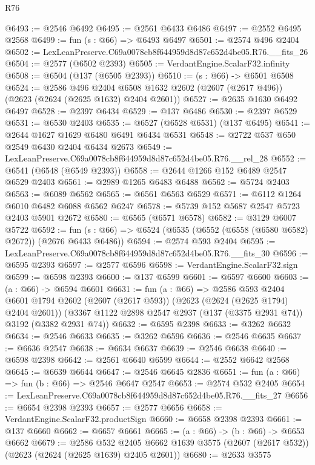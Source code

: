 \begin{lexlean}{R76}
\begin{coremodule}
@6493 := @2546 @6492
@6495 := @2561 @6433 @6486
@6497 := @2552 @6495 @2568
@6499 := fun (s : @66) => @6493 @6497
@6501 := @2574 @496 @2404
@6502 := LexLeanPreserve.C69a0078cb8f644959d8d87c652d4be05.R76.__fits_26
@6504 := @2577 (@6502 @2393)
@6505 := VerdantEngine.ScalarF32.infinity
@6508 := @6504 (@137 (@6505 @2393))
@6510 := (s : @66) -> @6501 @6508
@6524 := @2586
    @496
    @2404
    @6508
    @1632
    @2602
    (@2607 (@2617 @496))
    (@2623 (@2624 (@2625 @1632) @2404 @2601))
@6527 := @2635 @1630 @6492 @6497
@6528 := @2397 @6434
@6529 := @137 @6486
@6530 := @2397 @6529
@6531 := @6530 @2403
@6535 := @6527 (@6528 @6531) (@137 @6495)
@6541 := @2644 @1627 @1629 @6480 @6491 @6434 @6531
@6548 := @2722 @537 @650 @2549 @6430 @2404 @6434 @2673
@6549 := LexLeanPreserve.C69a0078cb8f644959d8d87c652d4be05.R76.__rel_28
@6552 := @6541 (@6548 (@6549 @2393))
@6558 := @2644 @1266 @152 @6489 @2547 @6529 @2403
@6561 := @2989 @1265 @6483 @6488
@6562 := @5724 @2403
@6563 := @6089 @6562
@6565 := @6561 @6563 @6529
@6571 := @6112 @1264 @6010 @6482 @6088 @6562 @6247
@6578 := @5739 @152 @5687 @2547 @5723 @2403 @5901 @2672
@6580 := @6565 (@6571 @6578)
@6582 := @3129 @6007 @5722
@6592 := fun (s : @66) => @6524 (@6535 (@6552 (@6558 (@6580 @6582) @2672)) (@2676 @6433 @6486))
@6594 := @2574 @593 @2404
@6595 := LexLeanPreserve.C69a0078cb8f644959d8d87c652d4be05.R76.__fits_30
@6596 := @6595 @2393
@6597 := @2577 @6596
@6598 := VerdantEngine.ScalarF32.sign
@6599 := @6598 @2393
@6600 := @137 @6599
@6601 := @6597 @6600
@6603 := (a : @66) -> @6594 @6601
@6631 := fun (a : @66) =>
  @2586
    @593
    @2404
    @6601
    @1794
    @2602
    (@2607 (@2617 @593))
    (@2623 (@2624 (@2625 @1794) @2404 @2601))
    (@3367 @1122 @2898 @2547 @2937 (@137 (@3375 @2931 @74)) @3192 (@3382 @2931 @74))
@6632 := @6595 @2398
@6633 := @3262 @6632
@6634 := @2546 @6633
@6635 := @3262 @6596
@6636 := @2546 @6635
@6637 := @6636 @2547
@6638 := @6634 @6637
@6639 := @2546 @6638
@6640 := @6598 @2398
@6642 := @2561 @6640 @6599
@6644 := @2552 @6642 @2568
@6645 := @6639 @6644
@6647 := @2546 @6645 @2836
@6651 := fun (a : @66) => fun (b : @66) => @2546 @6647 @2547
@6653 := @2574 @532 @2405
@6654 := LexLeanPreserve.C69a0078cb8f644959d8d87c652d4be05.R76.__fits_27
@6656 := @6654 @2398 @2393
@6657 := @2577 @6656
@6658 := VerdantEngine.ScalarF32.productSign
@6660 := @6658 @2398 @2393
@6661 := @137 @6660
@6662 := @6657 @6661
@6665 := (a : @66) -> (b : @66) -> @6653 @6662
@6679 := @2586
    @532
    @2405
    @6662
    @1639
    @3575
    (@2607 (@2617 @532))
    (@2623 (@2624 (@2625 @1639) @2405 @2601))
@6680 := @2633 @3575

\end{coremodule}
\end{lexlean}
